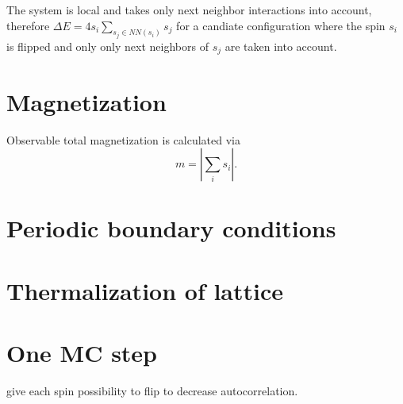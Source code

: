 \documentclass[a4paper,11pt,bibtotoc]{scrartcl}
\begin{document}
The system is local and takes only next neighbor interactions into account,  therefore $\Delta E = 4 s_i \sum_{s_j \in NN(s_i)} s_j$ for a candiate configuration where the spin $s_i$ is flipped and only only next neighbors of $s_j$ are taken into account.

\section{Magnetization}
Observable total magnetization is calculated via
\begin{equation}
  m = |\sum_i s_i|.
\end{equation}

\section{Periodic boundary conditions}
\section{Thermalization of lattice}
\section{One MC step}
give each spin possibility to flip to decrease autocorrelation.
\end{document}
